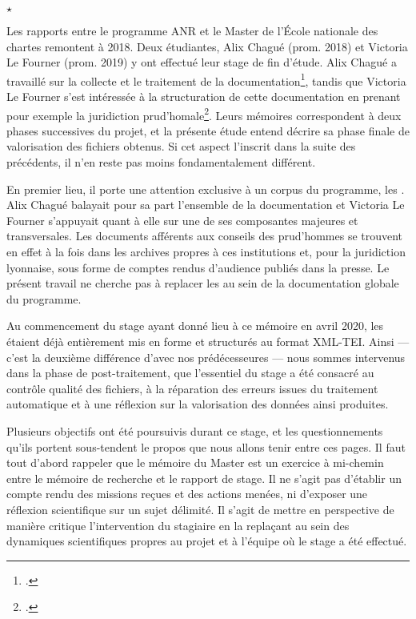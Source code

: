 \begin{center}
$\star$
\end{center} 

Les rapports entre le programme ANR \timeus{} et le Master \tnah{} de l'École nationale des chartes remontent à 2018. Deux étudiantes, Alix Chagué (prom. 2018) et Victoria Le Fourner (prom. 2019) y ont effectué leur stage de fin d'étude. Alix Chagué a travaillé sur la collecte et le traitement de la documentation\footcite{chague}, tandis que Victoria Le Fourner s'est intéressée à la structuration de cette documentation en prenant pour exemple la juridiction prud'homale\footcite{lefourner}. Leurs mémoires correspondent à deux phases successives du projet, et la présente étude entend décrire sa phase finale de valorisation des fichiers obtenus. Si cet aspect l'inscrit dans la suite des précédents, il n'en reste pas moins fondamentalement différent.

En premier lieu, il porte une attention exclusive à un corpus du programme, les \odm. Alix Chagué balayait pour sa part l'ensemble de la documentation et Victoria Le Fourner s'appuyait quant à elle sur une de ses composantes majeures et transversales. Les documents afférents aux conseils des prud'hommes se trouvent en effet à la fois dans les archives propres à ces institutions et, pour la juridiction lyonnaise, sous forme de comptes rendus d'audience publiés dans la presse. Le présent travail ne cherche pas à replacer les \odm{} au sein de la documentation globale du programme.

Au commencement du stage ayant donné lieu à ce mémoire en avril 2020, les \odm{} étaient déjà entièrement mis en forme et structurés au format XML-TEI. Ainsi --- c'est la deuxième différence d'avec nos prédécesseures --- nous sommes intervenus dans la phase de post-traitement, \cad{} que l'essentiel du stage a été consacré au contrôle qualité des fichiers, à la réparation des erreurs issues du traitement automatique et à une réflexion sur la valorisation des données ainsi produites.

Plusieurs objectifs ont été poursuivis durant ce stage, et les questionnements qu'ils portent sous-tendent le propos que nous allons tenir entre ces pages. Il faut tout d'abord rappeler que le mémoire du Master \tnah{} est un exercice à mi-chemin entre le mémoire de recherche et le rapport de stage. Il ne s'agit pas d'établir un compte rendu des missions reçues et des actions menées, ni d'exposer une réflexion scientifique sur un sujet délimité. Il s'agit de mettre en perspective de manière critique l'intervention du stagiaire en la replaçant au sein des dynamiques scientifiques propres au projet et à l'équipe où le stage a été effectué.

